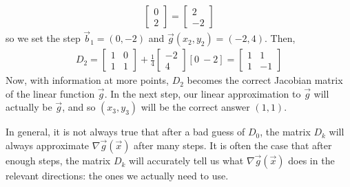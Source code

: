\documentclass[11pt]{elegantbook}
\begin{document}
\begin{example}
\begin{enumerate}
\begin{equation}
\begin{aligned}
\begin{bmatrix}
                0\\
                2
            \end{bmatrix}=\begin{bmatrix}
                2\\
                -2
            \end{bmatrix}
        \end{aligned}
        \nonumber
    \end{equation}
    so we set the step $\vec{b}_1=(0,-2)$ and $\vec{g}(x_2,y_2)=(-2,4)$. Then,
    \begin{equation}
        \begin{aligned}
            D_2=\begin{bmatrix}
                1&0\\
                1&1
            \end{bmatrix}+\frac{1}{4}\begin{bmatrix}
                -2\\
                4
            \end{bmatrix}[0\ -2]=\begin{bmatrix}
                1&1\\
                1&-1
            \end{bmatrix}
        \end{aligned}
        \nonumber
    \end{equation}
    Now, with information at more points, $D_2$ becomes the correct Jacobian matrix of the linear function $\vec{g}$. In the next step, our linear approximation to $\vec{g}$ will actually be $\vec{g}$, and so $(x_3,y_3)$ will be the correct answer $(1,1)$.
\end{enumerate}
In general, it is not always true that after a bad guess of $D_0$, the matrix $D_k$ will always approximate $\nabla \vec{g}(\vec{x})$ after many steps. It is often the case that after enough steps, the matrix $D_k$ will accurately tell us what $\nabla \vec{g}(\vec{x})$ does in the relevant directions: the ones we actually need to use.
\end{example}
\end{document}
